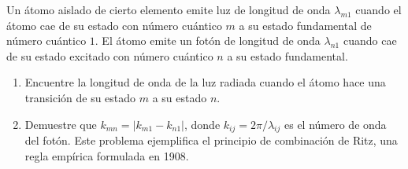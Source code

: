 \item Un átomo aislado de cierto elemento emite luz de longitud de onda $\lambda_{m1}$ cuando el átomo cae de su estado con número cuántico $m$ a su estado fundamental de número cuántico $1$. El átomo emite un fotón de longitud de onda $\lambda_{n1}$ cuando cae de su estado excitado con número cuántico $n$ a su estado fundamental.
\begin{enumerate}
    \item Encuentre la longitud de onda de la luz radiada cuando el átomo hace una transición de su estado $m$ a su estado $n$.
    \item Demuestre que $k_{mn} = |k_{m1} - k_{n1}|$, donde $k_{ij} = 2\pi/\lambda_{ij}$ es el número de onda del fotón. Este problema ejemplifica el principio de combinación de Ritz, una regla empírica formulada en 1908.
\end{enumerate}